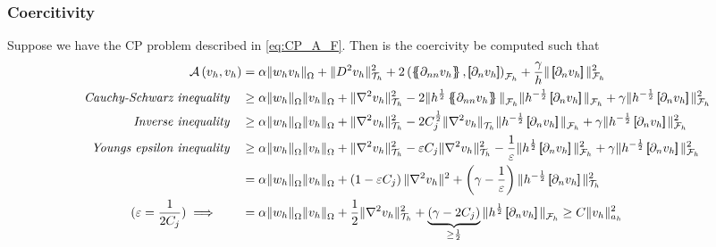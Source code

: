 \subsubsection{Coercitivity}%
\label{ssub:coercitivity}


Suppose we have the CP problem described in \eqref{eq:CP_A_F}. Then is the coercivity be computed such that
\[
    \begin{split}
\mathcal{A} \left( v_{h}, v_{h} \right) & =\alpha \|  w_{h}  v_{h} \|_{ \Omega  }^{  } +  \| D^2v_{h} \|_{ \mathcal{T} _{h} }^{2  }  + 2 \left(  \mean{ \partial _{nn} v_{h} }    ,  \jump{ \partial _{n}v_{h} }     \right) _{\mathcal{F} _{h}} +  \frac{\gamma}{h} \|  \jump{ \partial _{n} v_{h} }
  \|_{ \mathcal{F} _{h} }^{ 2 } \\
\quad \textit{Cauchy-Schwarz inequality} \quad
& \ge \alpha \| w_{h}  \|_{\Omega   }^{  } \| v_{h} \|_{\Omega   }^{  } +   \| \nabla ^2 v_{h} \|_{ \mathcal{T} _{h} }^{2  } -2 \| h^{\frac{1}{2}} \mean{ \partial _{nn}v_{h} }    \|_{  \mathcal{F} _{h}}^{  } \| h^{-\frac{1}{2}} \jump{ \partial _{n}v_{h} }    \|_{  \mathcal{F} _{h}}^{  } + \gamma \| h^{-\frac{1}{2}}  \jump{ \partial _{n}v_{h} }   \|_{ \mathcal{F} _{h}  }^{ 2 } \\
\quad \textit{Inverse inequality} \quad
 &  \ge \alpha \| w_{h}  \|_{\Omega   }^{  } \| v_{h} \|_{\Omega   }^{  } + \| \nabla ^2 v_{h}  \|_{ \mathcal{T} _{h}  }^{ 2  } - 2 C^{\frac{1}{2}}_{j} \|   \nabla ^2 v_{h}    \|_{ \mathcal{T} _{h}  }^{  } \| h^{-\frac{1}{2}} \jump{ \partial _{n} v_{h} }   \|_{ \mathcal{F} _{h} }^{  }  + \gamma \| h^{ -\frac{1}{2}} \jump{
 \partial _{n } v_{h}}   \|_{ \mathcal{F}_{h}}^{2}  \\
\quad \textit{ Youngs epsilon inequality} \quad
  &  \ge\alpha \| w_{h}  \|_{\Omega   }^{  } \| v_{h} \|_{\Omega   }^{  } +  \| \nabla ^2 v_{h} \|_{ \mathcal{T}_{h}  }^{2  } - \varepsilon C_{j} \| \nabla ^2 v_{h} \|_{ \mathcal{T} _{h} }^{2  } - \frac{1}{\varepsilon } \| h^{\frac{1}{2}} \jump{ \partial _{n} v_{h} }   \|_{ \mathcal{F} _{h} }^{2  }  + \gamma \|
  h^{-\frac{1}{2}} \jump{ \partial _{n} v_{h}}   \|_{ \mathcal{F} _{h} }^{2  }  \\
  & =  \alpha \| w_{h}  \|_{\Omega   }^{  } \| v_{h} \|_{\Omega   }^{  } +\left( 1 - \varepsilon C_{j} \right) \| \nabla ^2 v_{h} \|_{  }^{ 2 } + \left( \gamma  - \frac{1}{\varepsilon } \right) \| h^{-\frac{1}{2}} \jump{ \partial _{n} v_{h} }   \|_{ \mathcal{T} _{h} }^{ 2 } \\
  (\varepsilon  = \frac{1}{2 C_{j} })  \implies  \quad \quad &= \alpha \| w_{h}  \|_{\Omega   }^{  } \| v_{h} \|_{\Omega   }^{  } +\frac{1}{2} \| \nabla ^2 v_{h} \|_{ \mathcal{T} _{h} }^{ 2 }  + \underbrace{\left( \gamma -2 C_{j} \right)}_{ \ge  \frac{1}{2}}  \| h^{\frac{1}{2}} \jump{ \partial _{n} v_{h} }   \|_{
  \mathcal{F} _{h} }^{  } \ge C \| v_{h} \|_{ a_{h} }^{  2}
    \end{split}
\]
